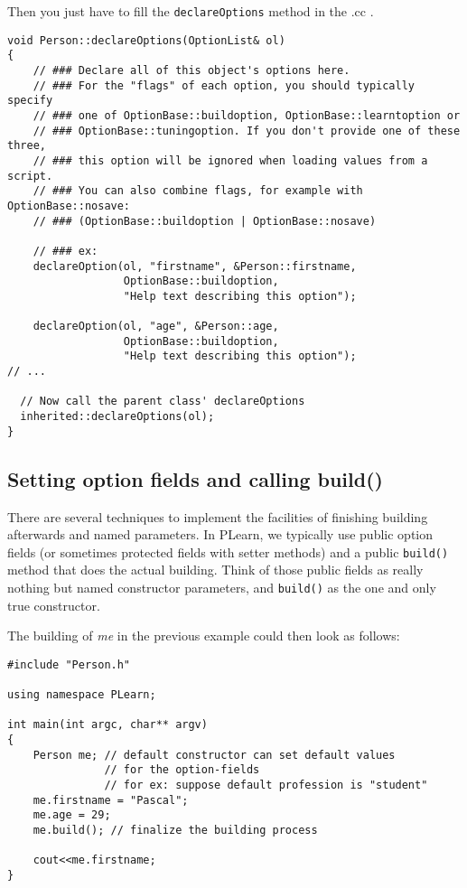 \documentclass[11pt]{book}
\begin{document}
Then you just have to fill the \texttt{declareOptions} method in the .cc .

\begin{verbatim}
void Person::declareOptions(OptionList& ol) 
{
    // ### Declare all of this object's options here.
    // ### For the "flags" of each option, you should typically specify
    // ### one of OptionBase::buildoption, OptionBase::learntoption or
    // ### OptionBase::tuningoption. If you don't provide one of these three,
    // ### this option will be ignored when loading values from a script.
    // ### You can also combine flags, for example with OptionBase::nosave:
    // ### (OptionBase::buildoption | OptionBase::nosave)

    // ### ex:
    declareOption(ol, "firstname", &Person::firstname,
                  OptionBase::buildoption,
                  "Help text describing this option");

    declareOption(ol, "age", &Person::age,
                  OptionBase::buildoption,
                  "Help text describing this option");
// ...

  // Now call the parent class' declareOptions
  inherited::declareOptions(ol);
}
\end{verbatim}

\subsection{Setting option fields and calling build()}

There are several techniques to implement the facilities of finishing
building afterwards and named parameters.  In PLearn, we typically
use public option fields (or sometimes protected fields with setter
methods) and a public {\tt build()} method that does the actual
building. Think of those public fields as really nothing but named
constructor parameters, and {\tt build()} as the one and only true
constructor.

The building of {\em me} in the previous example could then look
as follows:

\begin{verbatim}
#include "Person.h"

using namespace PLearn;

int main(int argc, char** argv)
{
    Person me; // default constructor can set default values 
               // for the option-fields
               // for ex: suppose default profession is "student"
    me.firstname = "Pascal";
    me.age = 29;
    me.build(); // finalize the building process

    cout<<me.firstname; 
}
\end{verbatim}
\end{document}
